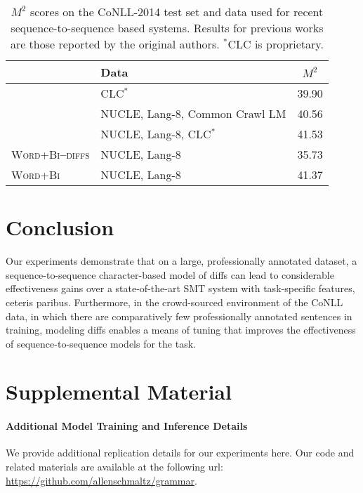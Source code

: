 \documentclass[11pt,letterpaper]{article}
\begin{document}
\begin{table}
\centering
\small
\begin{tabular}{lT{26mm}c}
\toprule
& Data & $M^2$ \\
\midrule
{} & CLC$^*$ & 39.90 \\
\midrule
{} & NUCLE, Lang-8, Common Crawl LM & 40.56 \\
\midrule
{} & NUCLE, Lang-8, CLC$^*$ & 41.53 \\
\midrule
\textsc{Word+Bi\textbf{--}diffs} & NUCLE, Lang-8 & 35.73 \\
\textsc{Word+Bi} & NUCLE, Lang-8 & 41.37  \\ 
\bottomrule
\end{tabular}
\caption{\small{$M^2$ scores on the CoNLL-2014 test set and data used for recent sequence-to-sequence based systems. Results for previous works are those reported by the original authors. $^*$CLC is proprietary.}
\label{table:conll-data-and-test}}
\end{table}

\section{Conclusion}

Our experiments demonstrate that on a large, professionally annotated dataset, a sequence-to-sequence character-based model of diffs can lead to considerable effectiveness gains over a state-of-the-art SMT system with task-specific features, ceteris paribus. Furthermore, in the crowd-sourced environment of the CoNLL data, in which there are comparatively few professionally annotated sentences in training, modeling diffs enables a means of tuning that improves the effectiveness of sequence-to-sequence models for the task.




\appendix

\section{Supplemental Material}
\label{sec:supplemental}

\paragraph{Additional Model Training and Inference Details} We provide additional replication details for our experiments here. Our code and related materials are available at the following url: \url{https://github.com/allenschmaltz/grammar}.
\end{document}
